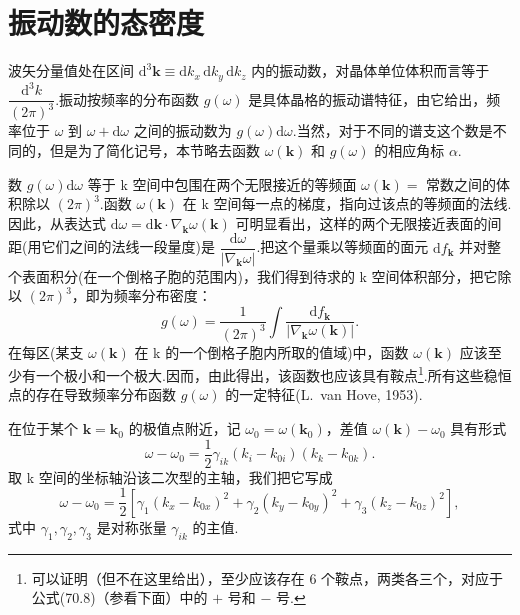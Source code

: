 \section{振动数的态密度}

波矢分量值处在区间 $\mathrm{d}^3\boldsymbol{k}\equiv\mathrm{d}k_x\,\mathrm{d}k_y\,\mathrm{d}k_z$ 内的振动数，对晶体单位体积而言等于 $\dfrac{\mathrm{d}^3k}{(2\pi)^3}$.振动按频率的分布函数 $g(\omega)$ 是具体晶格的振动谱特征，由它给出，频率位于 $\omega$ 到 $\omega+\mathrm{d}\omega$ 之间的振动数为 $g(\omega)\mathrm{d}\omega$.当然，对于不同的谱支这个数是不同的，但是为了简化记号，本节略去函数 $\omega(\boldsymbol{k})$ 和 $g(\omega)$ 的相应角标 $\alpha$.

数 $g(\omega)\mathrm{d}\omega$ 等于 k 空间中包围在两个无限接近的等频面 $\omega(\boldsymbol{k})=$ 常数之间的体积除以 $(2\pi)^3$.函数 $\omega(\boldsymbol{k})$ 在 k 空间每一点的梯度，指向过该点的等频面的法线.因此，从表达式 $\mathrm{d}\omega=\mathrm{d}\boldsymbol{k}\cdot\nabla_{\boldsymbol{k}}\omega(\boldsymbol{k})$ 可明显看出，这样的两个无限接近表面的间距(用它们之间的法线一段量度)是 $\dfrac{\mathrm{d}\omega}{|\nabla_{\boldsymbol{k}}\omega|}$.把这个量乘以等频面的面元 $\mathrm{d}f_{\boldsymbol{k}}$ 并对整个表面积分(在一个倒格子胞的范围内)，我们得到待求的 k 空间体积部分，把它除以 $(2\pi)^3$，即为频率分布密度：
\begin{equation}
  g(\omega)=\frac{1}{(2\pi)^3}\int\frac{\mathrm{d}f_{\boldsymbol{k}}}{\left|\nabla_{\boldsymbol{k}}\omega(\boldsymbol{k})\right|}.
\end{equation}
在每区(某支 $\omega(\boldsymbol{k})$ 在 k 的一个倒格子胞内所取的值域)中，函数 $\omega(\boldsymbol{k})$ 应该至少有一个极小和一个极大.因而，由此得出，该函数也应该具有鞍点\footnote{可以证明（但不在这里给出），至少应该存在 6 个鞍点，两类各三个，对应于公式(70.8)（参看下面）中的 $+$ 号和 $-$ 号.}.所有这些稳恒点的存在导致频率分布函数 $g(\omega)$ 的一定特征(L.~van Hove, 1953).

在位于某个 $\boldsymbol{k}=\boldsymbol{k}_0$ 的极值点附近，记 $\omega_0=\omega(\boldsymbol{k}_0)$，差值 $\omega(\boldsymbol{k})-\omega_0$ 具有形式
\begin{equation*}
  \omega-\omega_0=\frac{1}{2}\gamma_{ik}\left(k_i-k_{0i}\right)\left(k_k-k_{0k}\right).
\end{equation*}
取 k 空间的坐标轴沿该二次型的主轴，我们把它写成
\begin{equation}
  \omega-\omega_0=\frac{1}{2}\left[\gamma_1(k_x-k_{0x})^2+\gamma_2(k_y-k_{0y})^2+\gamma_3(k_z-k_{0z})^2\right],
\end{equation}
式中 $\gamma_1,\gamma_2,\gamma_3$ 是对称张量 $\gamma_{ik}$ 的主值.

